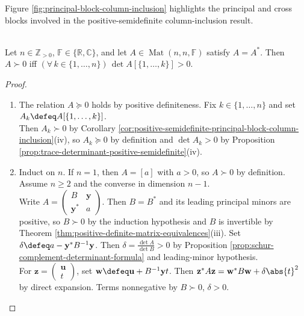 Figure \ref{fig:principal-block-column-inclusion} highlights the principal and cross blocks involved in the positive-semidefinite column-inclusion result.

\begin{illustrationfigure}[H]
  \centering
  
  \caption{For $A\succeq0$, factorisation forces $\operatorname{col}(A_{12})\subseteq\operatorname{col}(A_{11})$.}
  \label{fig:principal-block-column-inclusion}
\end{illustrationfigure}

\begin{theorem} \label{thm:sylvester-positive-definite-criterion-leading-minors} \\
Let $n\in\mathbb{Z}_{>0}$, $\mathbb{F}\in\{\mathbb{R},\mathbb{C}\}$, and let $A\in\operatorname{Mat}(n,n,\mathbb{F})$ satisfy $A=A^*$. Then $A\succ0$ iff $(\forall\,k\in\{1,\ldots,n\})\,\det A[\{1,\ldots,k\}]>0$.
\begin{proof}
\begin{enumerate}[label=\roman*.]
\setlength{\itemsep}{0pt}
\item[$(\Rightarrow)$] The relation $A\succeq0$ holds by positive definiteness. Fix $k\in\{1,\ldots,n\}$ and set $A_k\defeq A[\{1,\ldots,k\}]$.\\
Then $A_k\succ0$ by Corollary \ref{cor:positive-semidefinite-principal-block-column-inclusion}(iv), so $A_k\succeq0$ by definition and $\det A_k>0$ by Proposition \ref{prop:trace-determinant-positive-semidefinite}(iv).
\item[$(\Leftarrow)$] Induct on $n$. If $n=1$, then $A=[a]$ with $a>0$, so $A\succ0$ by definition. Assume $n\geq2$ and the converse in dimension $n-1$.\\
Write $A=\left(\begin{smallmatrix}B&\mathbf{y}\\\mathbf{y}^*&a\end{smallmatrix}\right)$. Then $B=B^*$ and its leading principal minors are positive, so $B\succ0$ by the induction hypothesis and $B$ is invertible by Theorem \ref{thm:positive-definite-matrix-equivalences}(iii). Set $\delta\defeq a-\mathbf{y}^*B^{-1}\mathbf{y}$. Then $\delta=\frac{\det A}{\det B}>0$ by Proposition \ref{prop:schur-complement-determinant-formula} and leading-minor hypothesis.\\
For $\mathbf{z}=\left(\begin{smallmatrix}\mathbf{u}\\t\end{smallmatrix}\right)$, set $\mathbf{w}\defeq\mathbf{u}+B^{-1}\mathbf{y}t$. Then $\mathbf{z}^*A\mathbf{z}=\mathbf{w}^*B\mathbf{w}+\delta\abs{t}^2$ by direct expansion. Terms nonnegative by $B\succ0$, $\delta>0$.\\

\end{enumerate}
\end{proof}
\end{theorem}
